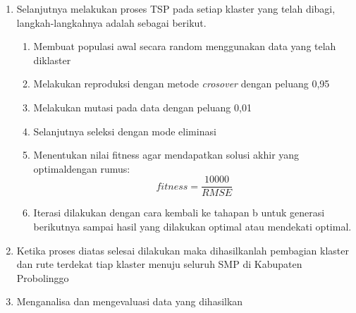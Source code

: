 \begin{enumerate}
	\item Selanjutnya melakukan proses TSP pada setiap klaster yang telah dibagi, langkah-langkahnya adalah sebagai berikut.
	\begin{enumerate}
	    \item Membuat populasi awal secara random menggunakan data yang telah diklaster
	    \item Melakukan reproduksi dengan metode \textit{crosover} dengan peluang 0,95
	    \item Melakukan mutasi pada data dengan peluang 0,01
	    \item Selanjutnya seleksi dengan mode eliminasi
	    \item Menentukan nilai fitness agar mendapatkan solusi akhir yang optimaldengan rumus:
	    \begin{equation}
	    fitness=\frac{10000}{RMSE}
	    \end{equation}
	    \item Iterasi dilakukan dengan cara kembali ke tahapan b untuk generasi berikutnya sampai hasil yang dilakukan optimal atau mendekati optimal.
    \end{enumerate}
	\item Ketika proses diatas selesai dilakukan maka dihasilkanlah pembagian klaster dan rute terdekat tiap klaster menuju seluruh SMP di Kabupaten Probolinggo
	\item Menganalisa dan mengevaluasi data yang dihasilkan
\end{enumerate}
